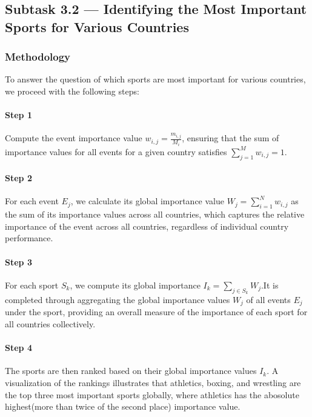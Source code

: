 \documentclass{mcmthesis}
\begin{document}
\subsection{Subtask 3.2 --- Identifying the Most Important Sports for Various Countries}



\subsubsection{Methodology}
To answer the question of which sports are most important for various countries, we proceed with the following steps:

\paragraph{Step 1}

Compute the event importance value $w_{i,j} = \frac{m_{i,j}}{M_i}$, ensuring that the sum of importance values for all events for a given country satisfies $\sum_{j=1}^M w_{i,j} = 1$.

\paragraph{Step 2}
For each event $E_j$, we calculate its global importance value $W_j = \sum_{i=1}^N w_{i,j}$ as the sum of its importance values across all countries, which captures the relative importance of the event across all countries, regardless of individual country performance.

\paragraph{Step 3}
For each sport $S_k$, we compute its global importance $I_k = \sum_{j \in S_k} W_j$.It is completed through aggregating the global importance values $W_j$ of all events $E_j$ under the sport, providing an overall measure of the importance of each sport for all countries collectively.

\paragraph{Step 4}
The sports are then ranked based on their global importance values $I_k$. A visualization of the rankings illustrates that athletics, boxing, and wrestling are the top three most important sports globally, where athletics has the abosolute highest(more than twice of the second place) importance value.
\end{document}

